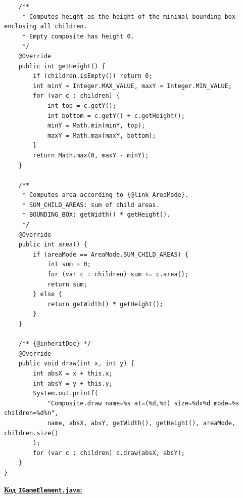 \documentclass[12pt,a4paper]{article}
\begin{document}
\begin{verbatim}
    /**
     * Computes height as the height of the minimal bounding box enclosing all children.
     * Empty composite has height 0.
     */
    @Override
    public int getHeight() {
        if (children.isEmpty()) return 0;
        int minY = Integer.MAX_VALUE, maxY = Integer.MIN_VALUE;
        for (var c : children) {
            int top = c.getY();
            int bottom = c.getY() + c.getHeight();
            minY = Math.min(minY, top);
            maxY = Math.max(maxY, bottom);
        }
        return Math.max(0, maxY - minY);
    }

    /**
     * Computes area according to {@link AreaMode}.
     * SUM_CHILD_AREAS: sum of child areas.
     * BOUNDING_BOX: getWidth() * getHeight().
     */
    @Override
    public int area() {
        if (areaMode == AreaMode.SUM_CHILD_AREAS) {
            int sum = 0;
            for (var c : children) sum += c.area();
            return sum;
        } else {
            return getWidth() * getHeight();
        }
    }

    /** {@inheritDoc} */
    @Override
    public void draw(int x, int y) {
        int absX = x + this.x;
        int absY = y + this.y;
        System.out.printf(
            "Composite.draw name=%s at=(%d,%d) size=%dx%d mode=%s children=%d%n",
            name, absX, absY, getWidth(), getHeight(), areaMode, children.size()
        );
        for (var c : children) c.draw(absX, absY);
    }
}
    \end{verbatim}

    \textbf{\underline{Код \texttt{IGameElement.java}:}}
\end{document}
